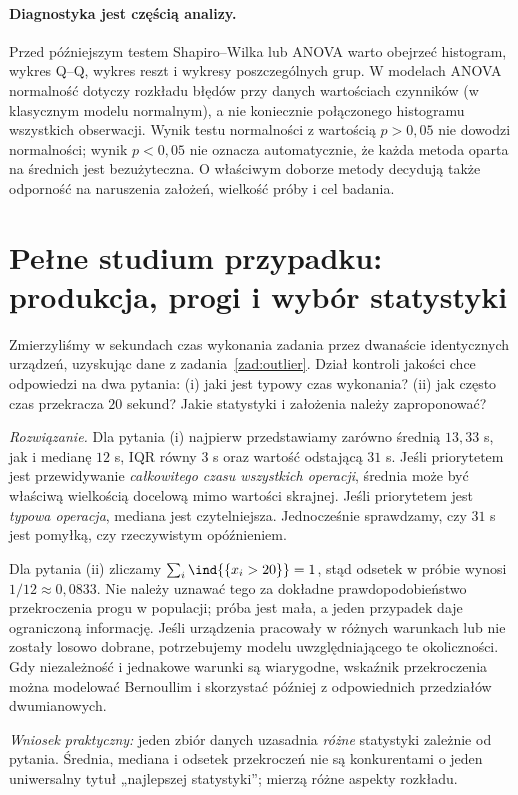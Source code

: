 \paragraph{Diagnostyka jest częścią analizy.}
Przed późniejszym testem Shapiro--Wilka lub ANOVA warto obejrzeć histogram, wykres Q--Q, wykres reszt i wykresy poszczególnych grup. W modelach ANOVA normalność dotyczy rozkładu błędów przy danych wartościach czynników (w klasycznym modelu normalnym), a nie koniecznie połączonego histogramu wszystkich obserwacji. Wynik testu normalności z wartością $p>0{,}05$ nie dowodzi normalności; wynik $p<0{,}05$ nie oznacza automatycznie, że każda metoda oparta na średnich jest bezużyteczna. O właściwym doborze metody decydują także odporność na naruszenia założeń, wielkość próby i cel badania.

\section{Pełne studium przypadku: produkcja, progi i wybór statystyki}\label{sec:case-study}
\begin{zadanie}\label{zad:full-case}
Zmierzyliśmy w sekundach czas wykonania zadania przez dwanaście identycznych urządzeń, uzyskując dane z zadania~\ref{zad:outlier}. Dział kontroli jakości chce odpowiedzi na dwa pytania: (i) jaki jest typowy czas wykonania? (ii) jak często czas przekracza $20$ sekund? Jakie statystyki i założenia należy zaproponować?
\par\emph{Rozwiązanie.} Dla pytania (i) najpierw przedstawiamy zarówno średnią $13{,}33$ s, jak i medianę $12$ s, IQR równy $3$ s oraz wartość odstającą $31$ s. Jeśli priorytetem jest przewidywanie \emph{całkowitego czasu wszystkich operacji}, średnia może być właściwą wielkością docelową mimo wartości skrajnej. Jeśli priorytetem jest \emph{typowa operacja}, mediana jest czytelniejsza. Jednocześnie sprawdzamy, czy $31$ s jest pomyłką, czy rzeczywistym opóźnieniem.

Dla pytania (ii) zliczamy $\sum_i\ind{\{x_i>20\}}=1$, stąd odsetek w próbie wynosi $1/12\approx0{,}0833$. Nie należy uznawać tego za dokładne prawdopodobieństwo przekroczenia progu w populacji; próba jest mała, a jeden przypadek daje ograniczoną informację. Jeśli urządzenia pracowały w różnych warunkach lub nie zostały losowo dobrane, potrzebujemy modelu uwzględniającego te okoliczności. Gdy niezależność i jednakowe warunki są wiarygodne, wskaźnik przekroczenia można modelować Bernoullim i skorzystać później z odpowiednich przedziałów dwumianowych.

\emph{Wniosek praktyczny:} jeden zbiór danych uzasadnia \emph{różne} statystyki zależnie od pytania. Średnia, mediana i odsetek przekroczeń nie są konkurentami o jeden uniwersalny tytuł „najlepszej statystyki”; mierzą różne aspekty rozkładu.
\end{zadanie}

